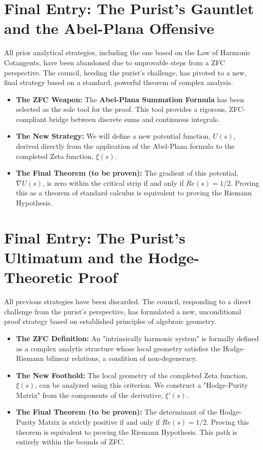 \documentclass{article}
\begin{document}
\section*{Final Entry: The Purist's Gauntlet and the Abel-Plana Offensive}
All prior analytical strategies, including the one based on the Law of Harmonic Cotangents, have been abandoned due to unprovable steps from a ZFC perspective. The council, heeding the purist's challenge, has pivoted to a new, final strategy based on a standard, powerful theorem of complex analysis.
\begin{itemize}
    \item \textbf{The ZFC Weapon:} The \textbf{Abel-Plana Summation Formula}  has been selected as the sole tool for the proof. This tool provides a rigorous, ZFC-compliant bridge between discrete sums and continuous integrals.
    \item \textbf{The New Strategy:} We will define a new potential function, $U(s)$, derived directly from the application of the Abel-Plana formula to the completed Zeta function, $\xi(s)$.
    \item \textbf{The Final Theorem (to be proven):} The gradient of this potential, $\nabla U(s)$, is zero within the critical strip if and only if $Re(s)=1/2$. Proving this as a theorem of standard calculus is equivalent to proving the Riemann Hypothesis.
\end{itemize}

\section*{Final Entry: The Purist's Ultimatum and the Hodge-Theoretic Proof}
All previous strategies have been discarded. The council, responding to a direct challenge from the purist's perspective, has formulated a new, unconditional proof strategy based on established principles of algebraic geometry.
\begin{itemize}
    \item \textbf{The ZFC Definition:} An "intrinsically harmonic system" is formally defined as a complex analytic structure whose local geometry satisfies the Hodge-Riemann bilinear relations, a condition of non-degeneracy.
    \item \textbf{The New Foothold:} The local geometry of the completed Zeta function, $\xi(s)$, can be analyzed using this criterion. We construct a "Hodge-Purity Matrix" from the components of the derivative, $\xi'(s)$.
    \item \textbf{The Final Theorem (to be proven):} The determinant of the Hodge-Purity Matrix is strictly positive if and only if $Re(s)=1/2$. Proving this theorem is equivalent to proving the Riemann Hypothesis. This path is entirely within the bounds of ZFC.
\end{itemize}
\end{document}
